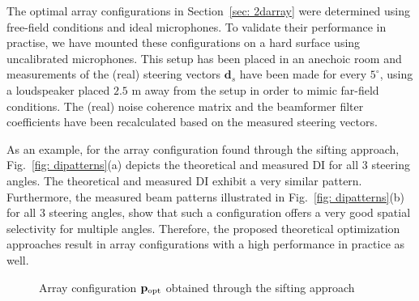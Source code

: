 \documentclass[9pt]{article}
\def\x{{\mathbf x}}
\begin{document}
The optimal array configurations in Section~\ref{sec: 2darray} were determined using free-field conditions and ideal microphones. To validate their performance in practise, we have mounted these configurations on a hard surface using uncalibrated microphones. 
This setup has been placed in an anechoic room and measurements of the (real) steering vectors $\mathbf{d}_s$ have been made for every $5^{\circ}$, using a loudspeaker placed $2.5$ m away from the setup in order to mimic far-field conditions. The (real) noise coherence matrix and the beamformer filter coefficients have been recalculated based on the measured steering vectors. 

As an example, for the array configuration found through the sifting approach, Fig.~\ref{fig: dipatterns}(a) depicts the theoretical and measured DI for all $3$ steering angles. The theoretical and measured DI exhibit a very similar pattern. Furthermore, the measured beam patterns illustrated in Fig.~\ref{fig: dipatterns}(b) for all $3$ steering angles, show that such a configuration offers a very good spatial selectivity for multiple angles. Therefore, the proposed theoretical optimization approaches result in array configurations with a high performance in practice as well.
\begin{figure}[t!]
      \centering
       \vspace{-0.5cm}
    \caption{Array configuration $\mathbf{p}_{\rm opt}$ obtained through the sifting approach}
  \label{fig: sift}
\end{figure} 
\end{document}
